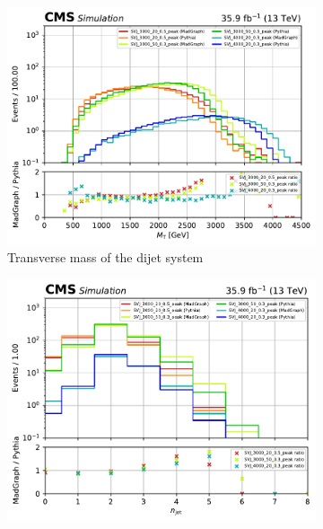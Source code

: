 \begin{figure}[htbp]
    \centering
    \begin{subfigure}[b]{0.45\textwidth}
        \includegraphics[width=\textwidth]{figures/madgraph_pythia_comparisons/with_ratios/part2/dijet_mt.pdf}
        \caption{Transverse mass of the dijet system}
    \end{subfigure}
    \hfill
    \begin{subfigure}[b]{0.45\textwidth}
        \includegraphics[width=\textwidth]{figures/madgraph_pythia_comparisons/with_ratios/part2/njet.pdf}
        \caption{\njet}
    \end{subfigure}


\end{figure}
